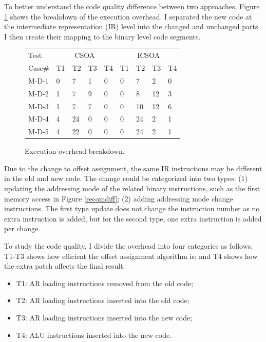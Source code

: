 To better understand the code quality difference between two approaches, Figure \ref{exebreakdown} shows the breakdown of the execution overhead. I separated the new code at the intermediate representation (IR) level into the changed and unchanged parts. I then create their mapping to the binary level code segments.


\begin{figure}[htdp]
\begin{small}

\begin{center}
\begin{tabular}{|p{0.5in}|p{0.2in}p{0.2in}p{0.2in}p{0.2in}|p{0.2in}p{0.2in}p{0.2in}p{0.2in}|}
\hline 
Test &\multicolumn{4}{c|}{CSOA} & \multicolumn{4}{c|}{ICSOA} \\
Case\# & T1 & T2 & T3 & T4 & T1 & T2 & T3 & T4\\
\hline \hline
M-D-1	&0	&7	&1	&0	&0	&7	&2	&0	\\
								
M-D-2	&1	&7	&9	&0	&0	&8	&12	&3	\\
									
M-D-3	&1	&7	&7	&0	&0	&10	&12	&6	\\
									
M-D-4	&4	&24	&0	&0	&0	&24	&2	&1	\\
									
M-D-5	&4	&22	&0	&0	&0	&24	&2	&1	\\

\hline

\end{tabular}
\end{center}
\caption{Execution overhead breakdown.}
\label{exebreakdown}
\end{small}
\vspace{-0.1in}
\end{figure}


Due to the change to offset assignment, the same IR instructions may be different in the old and new code. The change could be categorized into two types: (1) updating the addressing mode of the related binary instructions, such as the first memory access in Figure \ref{recomdiff}; (2) adding addressing mode change instructions. The first type update does not change the instruction number as no extra instruction is added,
but for the second type, one extra instruction is added per change. 

To study the code quality, I divide the overhead into four categories as follows. T1-T3 shows how efficient the offset assignment algorithm is; and T4 shows how the extra patch affects the final result.
\begin{itemize}
\item T1: AR loading instructions removed from the old code;
\item T2: AR loading instructions inserted into the old code;
\item T3: AR loading instructions inserted into the new code;
\item T4: ALU instructions inserted into the new code.
\end{itemize}

